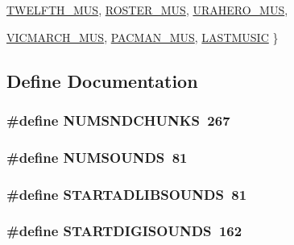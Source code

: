 \begin{DoxyCompactItemize}
\hyperlink{BUDIOWL6_8H_a196fbe29c4c02d90973f0b611ed0958ba2daba453f800e809bfb4fca6124da377}{TWELFTH\_\-MUS}, 
\hyperlink{BUDIOWL6_8H_a196fbe29c4c02d90973f0b611ed0958ba69e9e273ab13839b09e0976829002046}{ROSTER\_\-MUS}, 
\hyperlink{BUDIOWL6_8H_a196fbe29c4c02d90973f0b611ed0958ba7a71704b46eb8baaa32e6f817634328d}{URAHERO\_\-MUS}, 
\par
\hyperlink{BUDIOWL6_8H_a196fbe29c4c02d90973f0b611ed0958ba26a6deb65452e9b3f46d3e8571d2d2f7}{VICMARCH\_\-MUS}, 
\hyperlink{BUDIOWL6_8H_a196fbe29c4c02d90973f0b611ed0958ba69e6ef1a3a2ca4f191c98b37d6a8f0a9}{PACMAN\_\-MUS}, 
\hyperlink{BUDIOWL6_8H_a196fbe29c4c02d90973f0b611ed0958ba4c2fa07a163e141352f7e828f629dd59}{LASTMUSIC}
 \}
\end{DoxyCompactItemize}


\subsection{Define Documentation}
\hypertarget{BUDIOSOD_8H_adb660029e11963733384781d8bd6dc24}{
\subsubsection[{NUMSNDCHUNKS}]{\setlength{\rightskip}{0pt plus 5cm}\#define NUMSNDCHUNKS~267}}
\label{BUDIOSOD_8H_adb660029e11963733384781d8bd6dc24}
\hypertarget{BUDIOSOD_8H_aa948e91a657468d5faa690ec1a89230b}{
\subsubsection[{NUMSOUNDS}]{\setlength{\rightskip}{0pt plus 5cm}\#define NUMSOUNDS~81}}
\label{BUDIOSOD_8H_aa948e91a657468d5faa690ec1a89230b}
\hypertarget{BUDIOSOD_8H_a7d40bf6bf62cde9ae5f212e063328200}{
\subsubsection[{STARTADLIBSOUNDS}]{\setlength{\rightskip}{0pt plus 5cm}\#define STARTADLIBSOUNDS~81}}
\label{BUDIOSOD_8H_a7d40bf6bf62cde9ae5f212e063328200}
\hypertarget{BUDIOSOD_8H_adb5a42984ba81d350a944cc41434a6f7}{
\subsubsection[{STARTDIGISOUNDS}]{\setlength{\rightskip}{0pt plus 5cm}\#define STARTDIGISOUNDS~162}}
